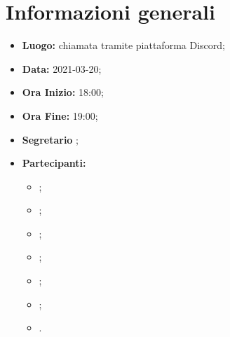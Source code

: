 \section{Informazioni generali}
	\begin{itemize}
		\item \textbf{Luogo:} chiamata tramite piattaforma Discord;
		\item \textbf{Data:} 2021-03-20;
		\item \textbf{Ora Inizio:} 18:00;
		\item \textbf{Ora Fine:} 19:00;
		\item \textbf{Segretario} \VAS;
		\item \textbf{Partecipanti:}
		\begin{itemize}
			\item \MB;
			\item \VAS;
			\item \FD;
			\item \NM;
			\item \SB;
			\item \GB;
			\item \MDI.
		\end{itemize}
		
	\end{itemize}